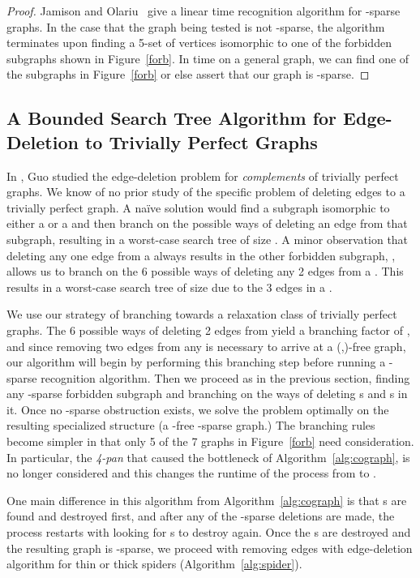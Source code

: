 \documentclass{llncs}
\begin{document}
\begin{proof}
Jamison and Olariu~\cite{JaOl} give a linear time recognition algorithm for -sparse graphs. In the case that the graph being tested is not -sparse, the algorithm terminates upon finding a 5-set of vertices isomorphic to one of the forbidden subgraphs shown in Figure~\ref{forb}. In  time on a general graph, we can find one of the subgraphs in Figure~\ref{forb} or else assert that our graph is -sparse.

\hfill 
\end{proof}

\subsection{A Bounded Search Tree Algorithm for Edge-Deletion to Trivially Perfect Graphs}

In \cite{Guo}, Guo studied the edge-deletion problem for \emph{complements} of trivially perfect graphs. We know of no prior study of the specific problem of deleting edges to a trivially perfect graph. A na\"ive solution would find a subgraph isomorphic to either a  or a  and then branch on the possible ways of deleting an edge from that subgraph, resulting in a worst-case search tree of size . A minor observation that deleting any one edge from a  always results in the other forbidden subgraph, , allows us to branch on the 6 possible ways of deleting any 2 edges from a . This results in a worst-case search tree of size  due to the 3 edges in a .

We use our strategy of branching towards a relaxation class of trivially perfect graphs. The 6 possible ways of deleting 2 edges from  yield a branching factor of , and since removing two edges from any  is necessary to arrive at a (,)-free graph, our algorithm will begin by performing this branching step before running a -sparse recognition algorithm. Then we proceed as in the previous section, finding any -sparse forbidden subgraph and branching on the ways of deleting s and s in it. Once no -sparse obstruction exists, we solve the problem optimally on the resulting specialized structure (a -free -sparse graph.) The branching rules become simpler in that only 5 of the 7 graphs in Figure~\ref{forb} need consideration. In particular, the \emph{4-pan} that caused the bottleneck of Algorithm~\ref{alg:cograph}, is no longer considered and this changes the runtime of the process from  to .

One main difference in this algorithm from Algorithm~\ref{alg:cograph} is that s are found and destroyed first, and after any of the -sparse deletions are made, the process restarts with looking for s to destroy again. Once the s are destroyed and the resulting graph is -sparse, we proceed with removing edges with edge-deletion algorithm for thin or thick spiders (Algorithm~\ref{alg:spider}).
\end{document}
